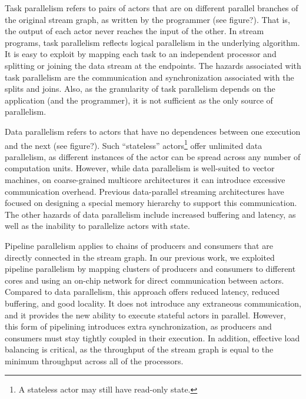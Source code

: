 Task parallelism refers to pairs of actors that are on different
parallel branches of the original stream graph, as written by the
programmer (see figure?).  That is, the output of each actor never
reaches the input of the other.  In stream programs, task parallelism
reflects logical parallelism in the underlying algorithm.  It is easy
to exploit by mapping each task to an independent processor and
splitting or joining the data stream at the endpoints.  The hazards
associated with task parallelism are the communication and
synchronization associated with the splits and joins.  Also, as the
granularity of task parallelism depends on the application (and the
programmer), it is not sufficient as the only source of parallelism.

Data parallelism refers to actors that have no dependences between one
execution and the next (see figure?).  Such ``stateless''
actors\footnote{A stateless actor may still have read-only state.}
offer unlimited data parallelism, as different instances of the actor
can be spread across any number of computation units.  However, while
data parallelism is well-suited to vector machines, on coarse-grained
multicore architectures it can introduce excessive communication
overhead.  Previous data-parallel streaming architectures have focused
on designing a special memory hierarchy to support this
communication\cite{imagine}.  The other hazards of data parallelism
include increased buffering and latency, as well as the inability to
parallelize actors with state.

Pipeline parallelism applies to chains of producers and consumers that
are directly connected in the stream graph.  In our previous work, we
exploited pipeline parallelism by mapping clusters of producers and
consumers to different cores and using an on-chip network for direct
communication between actors\cite{gordon02asplos}.  Compared to data
parallelism, this approach offers reduced latency, reduced buffering,
and good locality.  It does not introduce any extraneous
communication, and it provides the new ability to execute stateful
actors in parallel.  However, this form of pipelining introduces
extra synchronization, as producers and consumers must stay tightly
coupled in their execution.  In addition, effective load balancing is
critical, as the throughput of the stream graph is equal to the
minimum throughput across all of the processors.

